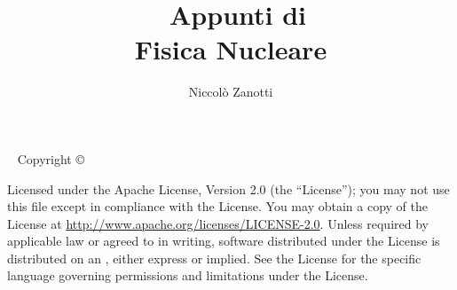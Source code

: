 \documentclass{tufte-book} %
\title{\qquad \quad \ Appunti di\\ \quad Fisica Nucleare} %
\author{Niccolò Zanotti} %
\theoremstyle{definition}
\theoremstyle{theorem}
\theoremstyle{plain}
\theoremstyle{remark}
\theoremstyle{remark}
\newcommand{\monthyear}{\ifcase\month\or January\or February\or March\or April\or May\or June\or July\or August\or September\or October\or November\or December\fi\space\number\year} %
\newcommand{\openepigraph}[2]{ %
\begin{fullwidth}
\sffamily\large
\begin{doublespace}
\noindent\allcaps{#1}\\ %
\noindent\allcaps{#2} %
\end{doublespace}
\end{fullwidth}
}
\begin{document}
\frontmatter




\maketitle %


\newpage
\begin{fullwidth}
~\vfill
\thispagestyle{empty}
\setlength{\parindent}{0pt}
\setlength{\parskip}{\baselineskip}
Copyright \copyright\ \the\year\ \thanklessauthor

\par{}

\par{}

\par Licensed under the Apache License, Version 2.0 (the ``License'');
you may not use this file except in compliance with the License.
You may obtain a copy of the License at \url{http://www.apache.org/licenses/LICENSE-2.0}.
Unless required by applicable law or agreed to in writing, software
distributed under the License is distributed on an , either express or implied.
See the License for the specific language governing permissions and
limitations under the License.

\end{fullwidth}


\tableofcontents %
\end{document}
